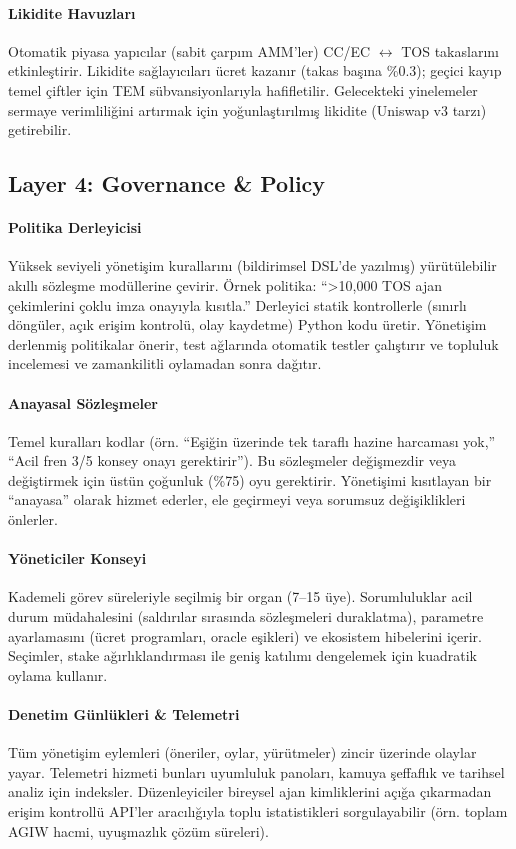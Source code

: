 \documentclass[11pt]{article}
\begin{document}
\paragraph{Likidite Havuzları} Otomatik piyasa yapıcılar (sabit çarpım AMM'ler) CC/EC $\leftrightarrow$ TOS takaslarını etkinleştirir. Likidite sağlayıcıları ücret kazanır (takas başına \%0.3); geçici kayıp temel çiftler için TEM sübvansiyonlarıyla hafifletilir. Gelecekteki yinelemeler sermaye verimliliğini artırmak için yoğunlaştırılmış likidite (Uniswap v3 tarzı) getirebilir.

\subsection{Layer 4: Governance \& Policy}
\paragraph{Politika Derleyicisi} Yüksek seviyeli yönetişim kurallarını (bildirimsel DSL'de yazılmış) yürütülebilir akıllı sözleşme modüllerine çevirir. Örnek politika: ``>10,000 TOS ajan çekimlerini çoklu imza onayıyla kısıtla.'' Derleyici statik kontrollerle (sınırlı döngüler, açık erişim kontrolü, olay kaydetme) Python kodu üretir. Yönetişim derlenmiş politikalar önerir, test ağlarında otomatik testler çalıştırır ve topluluk incelemesi ve zamankilitli oylamadan sonra dağıtır.

\paragraph{Anayasal Sözleşmeler} Temel kuralları kodlar (örn. ``Eşiğin üzerinde tek taraflı hazine harcaması yok,'' ``Acil fren 3/5 konsey onayı gerektirir''). Bu sözleşmeler değişmezdir veya değiştirmek için üstün çoğunluk (\%75) oyu gerektirir. Yönetişimi kısıtlayan bir ``anayasa'' olarak hizmet ederler, ele geçirmeyi veya sorumsuz değişiklikleri önlerler.

\paragraph{Yöneticiler Konseyi} Kademeli görev süreleriyle seçilmiş bir organ (7--15 üye). Sorumluluklar acil durum müdahalesini (saldırılar sırasında sözleşmeleri duraklatma), parametre ayarlamasını (ücret programları, oracle eşikleri) ve ekosistem hibelerini içerir. Seçimler, stake ağırlıklandırması ile geniş katılımı dengelemek için kuadratik oylama kullanır.

\paragraph{Denetim Günlükleri \& Telemetri} Tüm yönetişim eylemleri (öneriler, oylar, yürütmeler) zincir üzerinde olaylar yayar. Telemetri hizmeti bunları uyumluluk panoları, kamuya şeffaflık ve tarihsel analiz için indeksler. Düzenleyiciler bireysel ajan kimliklerini açığa çıkarmadan erişim kontrollü API'ler aracılığıyla toplu istatistikleri sorgulayabilir (örn. toplam AGIW hacmi, uyuşmazlık çözüm süreleri).
\end{document}
